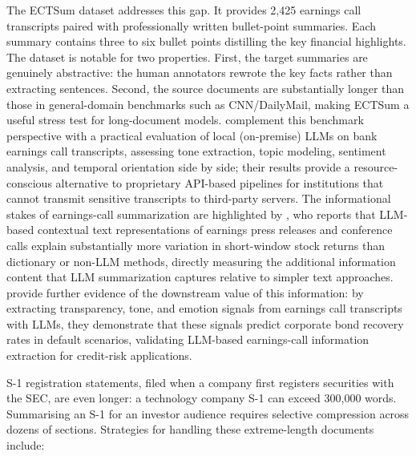 The ECTSum dataset \citep{mukherjee2022ectsum} addresses this gap. It provides 2,425
earnings call transcripts paired with professionally written bullet-point summaries.
Each summary contains three to six bullet points distilling the key financial highlights.
The dataset is notable for two properties. First, the target summaries are genuinely
abstractive: the human annotators rewrote the key facts rather than extracting sentences.
Second, the source documents are substantially longer than those in general-domain
benchmarks such as CNN/DailyMail, making ECTSum a useful stress test for long-document
models. \citet{CookKazinnik2023} complement this benchmark perspective with
a practical evaluation of local (on-premise) LLMs on bank earnings call transcripts,
assessing tone extraction, topic modeling, sentiment analysis, and temporal orientation
side by side; their results provide a resource-conscious alternative to proprietary
API-based pipelines for institutions that cannot transmit sensitive transcripts to
third-party servers.
The informational stakes of earnings-call summarization are highlighted by \citet{Siano2025}, who reports that LLM-based contextual text representations of earnings
press releases and conference calls explain substantially more variation in short-window
stock returns than dictionary or non-LLM methods, directly measuring the additional
information content that LLM summarization captures relative to simpler text approaches.
\citet{ErnstbergerNazemi2025} provide further evidence of the
downstream value of this information: by extracting transparency, tone, and emotion
signals from earnings call transcripts with LLMs, they demonstrate that these signals
predict corporate bond recovery rates in default scenarios, validating LLM-based
earnings-call information extraction for credit-risk applications.

S-1 registration statements, filed when a company first registers securities with the
SEC, are even longer: a technology company S-1 can exceed 300,000 words. Summarising
an S-1 for an investor audience requires selective compression across dozens of sections.
Strategies for handling these extreme-length documents include:

